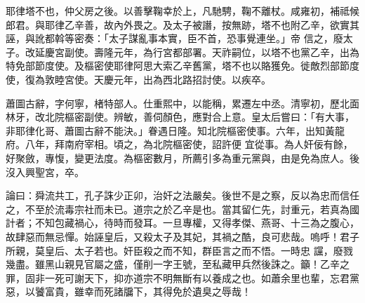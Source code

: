 \begin{pinyinscope}
 耶律塔不也，仲父房之後。以善擊鞠幸於上，凡馳騁，鞠不離杖。咸雍初，補祗候郎君。與耶律乙辛善，故內外畏之。及太子被譖，按無跡，塔不也附乙辛，欲實其誣，與訛都斡等密奏：「太子謀亂事本實，臣不首，恐事覺連坐。」帝
 信之，廢太子。改延慶宮副使。壽隆元年，為行宮都部署。天祚嗣位，以塔不也黨乙辛，出為特免部節度使。及樞密使耶律阿思大索乙辛舊黨，塔不也以賂獲免。徙敵烈部節度使，復為敦睦宮使。天慶元年，出為西北路招討使。以疾卒。



 蕭圖古辭，字何寧，楮特部人。仕重熙中，以能稱，累遷左中丞。清寧初，歷北面林牙，改北院樞密副使。辨敏，善伺顏色，應對合上意。皇太后嘗曰：「有大事，非耶律化哥、蕭圖古辭不能決。」眷遇日隆。知北院樞密使事。六年，出知黃龍府。八年，拜南府宰相。頃之，為北院樞密使，詔許便
 宜從事。為人奸佞有餘，好聚斂，專愎，變更法度。為樞密數月，所薦引多為重元黨與，由是免為庶人。後沒入興聖宮，卒。



 論曰：舜流共工，孔子誅少正卯，治奸之法嚴矣。後世不是之察，反以為忠而信任之，不至於流毒宗社而未已。道宗之於乙辛是也。當其留仁先，討重元，若真為國計者；不知包藏禍心，待時而發耳。一旦專權，又得孝傑、燕哥、十三為之腹心，故肆惡而無忌憚。始誣皇后，又殺太子及其妃，其禍之酷，良可悲哉。嗚呼！君子所親，莫皇后、太子若也。奸臣殺之而不知，群臣言之而不悟。一時忠
 讜，廢戮幾盡。雖黑山親見官屬之盛，僅削一字王號，至私藏甲兵然後誅之。籲！乙辛之罪，固非一死可謝天下，抑亦道宗不明無斷有以養成之也。如蕭余里也輩，忘君黨惡，以饕富貴，雖幸而死諸牖下，其得免於遺臭之辱哉！



\end{pinyinscope}
